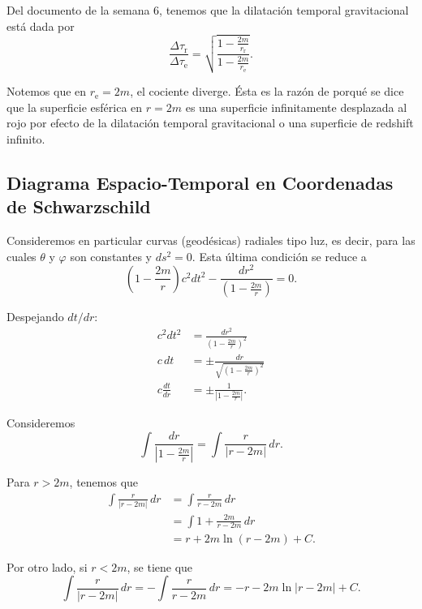 \documentclass[letterpaper,11pt]{article}
\begin{document}
Del documento de la semana 6, tenemos que la dilatación temporal gravitacional está dada por
\begin{equation}
\frac{\Delta \tau_{\text{r}}}{\Delta \tau_{\text{e}}} = \sqrt{\frac{1 -  \frac{2m}{r_{\text{r}}}}{1 - \frac{2m}{r_{\text{e}}}}}.
\end{equation}

Notemos que en $r_{\text{e}} = 2m$, el cociente diverge. Ésta es la razón de porqué se dice que la superficie esférica en $r = 2m$ es una superficie infinitamente desplazada al rojo por efecto de la dilatación temporal gravitacional o una superficie de redshift infinito.

\subsection*{Diagrama Espacio-Temporal en Coordenadas de Schwarzschild}

Consideremos en particular curvas (geodésicas) radiales tipo luz, es decir, para las cuales $\theta$ y $\varphi$ son constantes y $ds^2 = 0$. Esta última condición se reduce a 
\begin{equation}
\left(1 - \frac{2m}{r}\right) c^2 dt^2 - \frac{dr^2}{\left(1 - \frac{2m}{r}\right)} = 0.
\end{equation}

Despejando $dt/dr$:
\begin{align}
c^2dt^2 &= \frac{dr^2}{\left(1 - \frac{2m}{r}\right)^2} \\
c \,dt &= \pm \frac{dr}{\sqrt{\left(1 - \frac{2m}{r}\right)^2}} \\
c\frac{dt}{dr} &= \pm \frac{1}{\left| 1 - \frac{2m}{r}\right|}.  \label{eq:BH-6}
\end{align}

Consideremos 
\begin{equation}
\int \frac{dr}{\left| 1 - \frac{2m}{r} \right|} = \int \frac{r}{|r-2m|} \,dr.
\end{equation} 

Para $r > 2m$, tenemos que
\begin{align}
\int \frac{r}{|r-2m|} \,dr &= \int \frac{r}{r - 2m} \,dr \nonumber\\
&= \int 1 + \frac{2m}{r - 2m} \,dr \nonumber \\
&= r + 2m \ln(r-2m) + C.
\end{align}

Por otro lado, si $r < 2m$, se tiene que
\begin{equation}
\int \frac{r}{|r-2m|} \,dr = - \int \frac{r}{r - 2m} \,dr = - r - 2m \ln|r-2m| + C.
\end{equation}
\end{document}
